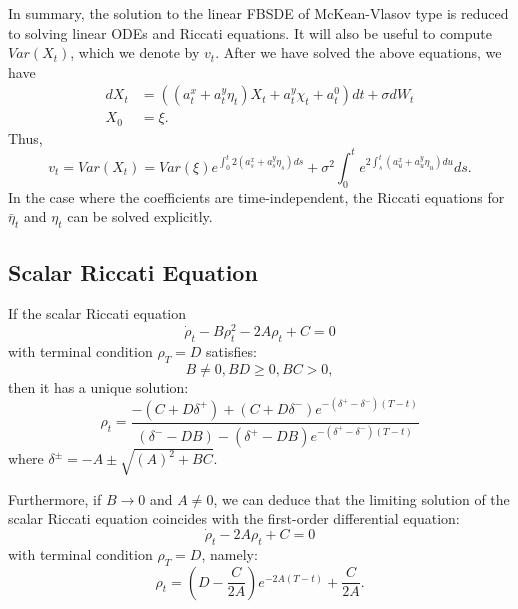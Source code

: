 \documentclass[11pt]{article}
\begin{document}
\begin{appendices}
In summary, the solution to the linear FBSDE of McKean-Vlasov type is reduced to solving linear ODEs and Riccati equations. It will also be useful to compute $Var(X_t)$, which we denote by $v_t$. After we have solved the above equations, we have
\begin{equation*}
\begin{split}
        dX_t&=\left((a^x_t+a^y_t \eta_t)X_t+a^y_t \chi_t+a^0_t\right)dt+\sigma dW_t \\
        X_0&=\xi.
\end{split}
\end{equation*}
Thus,
\begin{equation*}
    v_t=Var(X_t)=Var(\xi)e^{\int_0^t 2(a^x_s+a^y_s\eta_s)ds}+\sigma^2 \int_0^t e^{2 \int_s^t (a^x_u+a^y_u\eta_u) du}ds.
\end{equation*}
In the case where the coefficients are time-independent, the Riccati equations for $\bar{\eta}_t$ and $\eta_t$ can be solved explicitly.

\subsection*{\textbf{Scalar Riccati Equation}} If the scalar Riccati equation 
	\begin{equation*}
		\dot{\rho}_t - B \rho_t^2 - 2A \rho_t  + C = 0 
	\end{equation*}
	with terminal condition $\rho_T = D$ satisfies:
	\begin{equation}
		B \neq 0, BD \geq 0, BC>0,
	\label{eq:Riccati_assumptions}
	\end{equation}
	then it has a unique solution:
\begin{equation}
		\rho_t= \frac{-(C+D \delta^+) + (C+D \delta^-) e^{-(\delta^+ - \delta^-)(T-t)}}{(\delta^- - D B) - (\delta^+ - D B) e^{-(\delta^+ - \delta^-)(T-t)}}
	\label{eq:riccati_ut_sol_app}
\end{equation}
	where $\delta^\pm = -A \pm \sqrt{(A)^2 + B C}$.
	
	Furthermore, if $B \to 0$ and $A\neq 0$, we can deduce that the limiting solution of the scalar Riccati equation coincides with the first-order differential equation:
	\begin{equation*}
		\dot{\rho}_t - 2A \rho_t +C = 0 
	\end{equation*}
	with terminal condition $\rho_T = D$, namely:
	\begin{equation*}
		\rho_t = \left(D - \frac{C}{2A} \right) e^{-2A (T-t)} + \frac{C}{2A}.
	\end{equation*}
	

\end{appendices}
\end{document}
